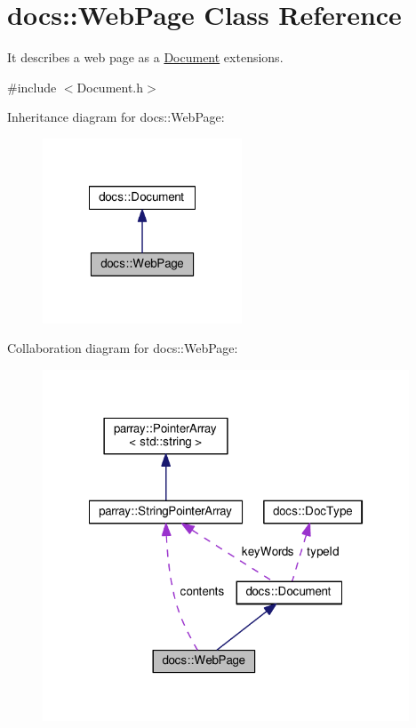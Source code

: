 \hypertarget{classdocs_1_1WebPage}{\section{docs\-:\-:Web\-Page Class Reference}
\label{classdocs_1_1WebPage}
}


It describes a web page as a \hyperlink{classdocs_1_1Document}{Document} extensions.  




{\ttfamily \#include $<$Document.\-h$>$}



Inheritance diagram for docs\-:\-:Web\-Page\-:\nopagebreak
\begin{figure}[H]
\begin{center}
\leavevmode
\includegraphics[width=168pt]{classdocs_1_1WebPage__inherit__graph}
\end{center}
\end{figure}


Collaboration diagram for docs\-:\-:Web\-Page\-:\nopagebreak
\begin{figure}[H]
\begin{center}
\leavevmode
\includegraphics[width=309pt]{classdocs_1_1WebPage__coll__graph}
\end{center}
\end{figure}
